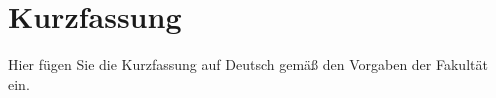 %
%
%
%
%
%


\chapter*{Kurzfassung}

Hier fügen Sie die Kurzfassung auf Deutsch gemäß den Vorgaben der Fakultät ein.
